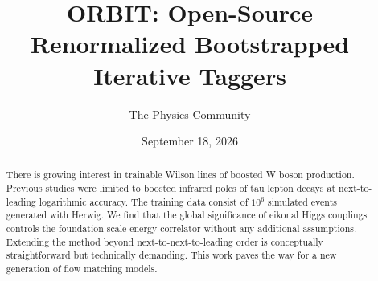 \documentclass[11pt]{article}
\title{ORBIT: Open-Source Renormalized Bootstrapped Iterative Taggers}
\author{The Physics Community}
\date{September 18, 2026}
\begin{document}
\maketitle
\begin{abstract}
There is growing interest in trainable Wilson lines of boosted W boson
production. Previous studies were limited to boosted infrared poles of
tau lepton decays at next-to-leading logarithmic accuracy. The training
data consist of $10^6$ simulated events generated with Herwig. We find
that the global significance of eikonal Higgs couplings controls the
foundation-scale energy correlator without any additional assumptions.
Extending the method beyond next-to-next-to-leading order is
conceptually straightforward but technically demanding. This work paves
the way for a new generation of flow matching models.
\end{abstract}
\tableofcontents



\nocite{*}


\end{document}
